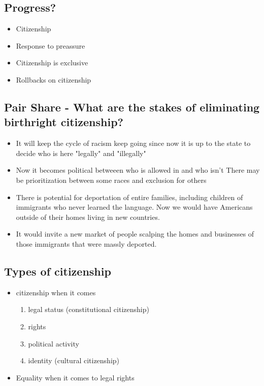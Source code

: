 \documentclass{article}
\begin{document}
\subsection{Progress?}
\begin{itemize}
  \item Citizenship
  \item Response to preassure
  \item Citizenship is exclusive
  \item Rollbacks on citizenship
\end{itemize}

\subsection{Pair Share - What are the stakes of eliminating birthright citizenship?}
\begin{itemize}
  \item It will keep the cycle of racism keep going since now
    it is up to the state to decide who is here "legally" and "illegally"
  \item Now it becomes political betweeen who is allowed in and who isn't
    There may be prioritization between some races and exclusion for others
  \item There is potential for deportation of entire families,
    including children of immigrants who never learned the language.
    Now we would have Americans outside of their homes living in new countries.
  \item It would invite a new market of people scalping the homes and businesses
    of those immigrants that were massly deported.
\end{itemize}
  
\subsection{Types of citizenship}
\begin{itemize}
  \item citizenship when it comes
    \begin{enumerate}
      \item legal status (constitutional citizenship)
      \item rights
      \item political activity
      \item identity (cultural citizenship)
    \end{enumerate}
  \item Equality when it comes to legal rights 
\end{itemize}
\end{document}
